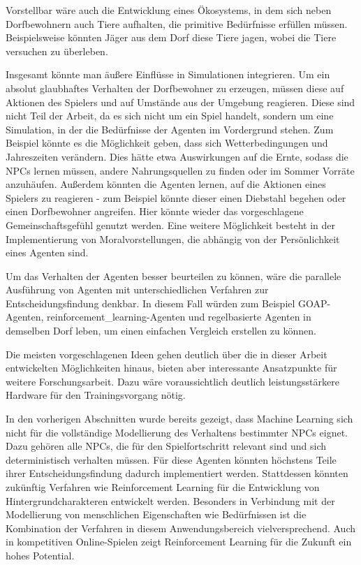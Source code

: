Vorstellbar wäre auch die Entwicklung eines Ökosystems, in dem sich neben Dorfbewohnern auch Tiere aufhalten, die primitive Bedürfnisse erfüllen müssen. Beispielsweise könnten Jäger aus dem Dorf diese Tiere jagen, wobei die Tiere versuchen zu überleben.

Insgesamt könnte man äußere Einflüsse in Simulationen integrieren. Um ein absolut glaubhaftes Verhalten der Dorfbewohner zu erzeugen, müssen diese auf Aktionen des Spielers und auf Umstände aus der Umgebung reagieren. Diese sind nicht Teil der Arbeit, da es sich nicht um ein Spiel handelt, sondern um eine Simulation, in der die Bedürfnisse der Agenten im Vordergrund stehen. Zum Beispiel könnte es die Möglichkeit geben, dass sich Wetterbedingungen und Jahreszeiten verändern. Dies hätte etwa Auswirkungen auf die Ernte, sodass die NPCs lernen müssen, andere Nahrungsquellen zu finden oder im Sommer Vorräte anzuhäufen. Außerdem könnten die Agenten lernen, auf die Aktionen eines Spielers zu reagieren - zum Beispiel könnte dieser einen Diebstahl begehen oder einen Dorfbewohner angreifen. Hier könnte wieder das vorgeschlagene Gemeinschaftsgefühl genutzt werden. Eine weitere Möglichkeit besteht in der Implementierung von Moralvorstellungen, die abhängig von der Persönlichkeit eines Agenten sind.

Um das Verhalten der Agenten besser beurteilen zu können, wäre die parallele Ausführung von Agenten mit unterschiedlichen Verfahren zur Entscheidungsfindung denkbar. In diesem Fall würden zum Beispiel GOAP-Agenten, \ac{reinforcement_learning}-Agenten und regelbasierte Agenten in demselben Dorf leben, um einen einfachen Vergleich erstellen zu können.

Die meisten vorgeschlagenen Ideen gehen deutlich über die in dieser Arbeit entwickelten Möglichkeiten hinaus, bieten aber interessante Ansatzpunkte für weitere Forschungsarbeit. Dazu wäre voraussichtlich deutlich leistungsstärkere Hardware für den Trainingsvorgang nötig.

In den vorherigen Abschnitten wurde bereits gezeigt, dass Machine Learning sich nicht für die vollständige Modellierung des Verhaltens bestimmter NPCs eignet. Dazu gehören alle NPCs, die für den Spielfortschritt relevant sind und sich deterministisch verhalten müssen. Für diese Agenten könnten höchstens Teile ihrer Entscheidungsfindung dadurch implementiert werden. Stattdessen könnten zukünftig Verfahren wie Reinforcement Learning für die Entwicklung von Hintergrundcharakteren entwickelt werden. Besonders in Verbindung mit der Modellierung von menschlichen Eigenschaften wie Bedürfnissen ist die Kombination der Verfahren in diesem Anwendungsbereich vielversprechend. Auch in kompetitiven Online-Spielen zeigt Reinforcement Learning für die Zukunft ein hohes Potential.

